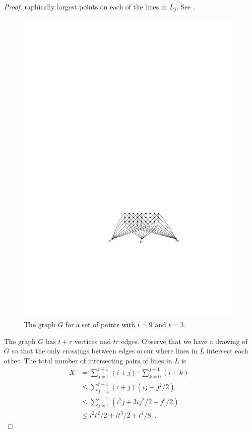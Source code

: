 \documentclass{cccg10}
\begin{document}
\begin{proof}
raphically largest points on each of the
lines in $L_j$.  See .

\begin{figure}
  \begin{center}
    \includegraphics{graph}
  \end{center}
  \caption{The graph $G$ for a set of points with $i=9$ and $t=3$.}
\end{figure}

The graph $G$ has $t+r$ vertices
and $tr$ edges.  Observe that we have a drawing of $G$ so that the only
crossings between edges occur where lines in $L$ intersect each other.
The total number of intersecting pairs of lines in $L$ is
\[
  \begin{aligned}
    X 
      & = \sum_{j=1}^{t-1}(i+j)\cdot\sum_{k=0}^{j-1}(i+k) \\
      & \le \sum_{j=1}^{t-1}(i+j)(ij + j^2/2) \\
      & \le \sum_{j=1}^{t-1}(i^2j+3ij^2/2 + j^3/2) \\
      & \le i^2t^2/2 + it^3/2 + t^4/8 \enspace .
  \end{aligned}
\]


\end{proof}
\end{document}
